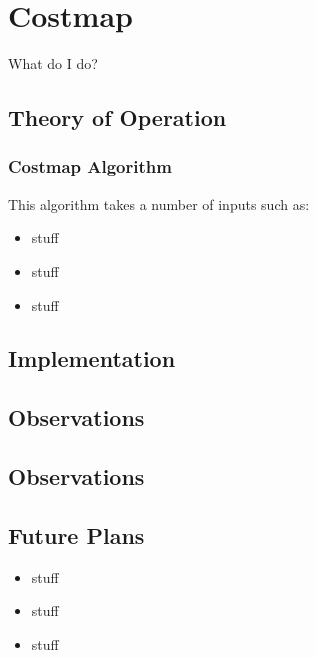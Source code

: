 \section{Costmap}

What do I do?

\subsection{Theory of Operation}


\subsubsection{Costmap Algorithm}

 This algorithm takes a number
of inputs such as:

\begin{itemize}
\item
  stuff
\item
  stuff
\item
  stuff
\end{itemize}


\subsection{Implementation}


\subsection{Observations}


\subsection{Observations}


\subsection{Future Plans}

\begin{itemize}
\item
  stuff
\item
  stuff
\item
  stuff
\end{itemize}
